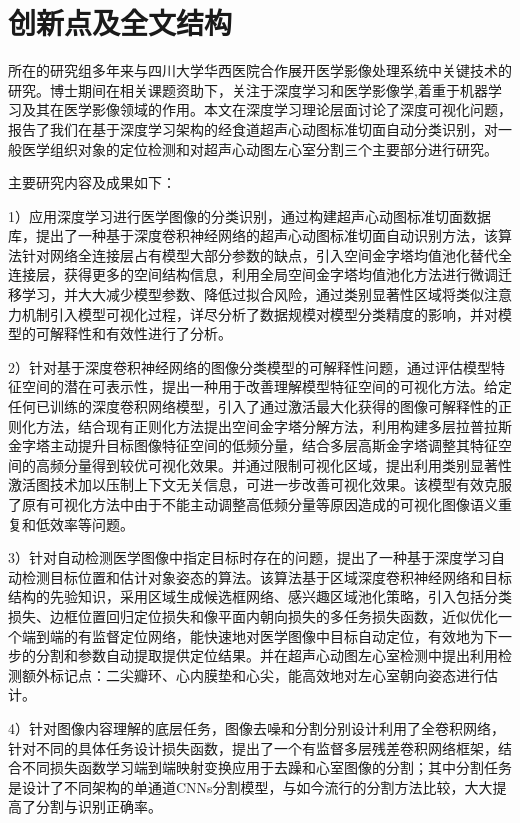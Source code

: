 \section{创新点及全文结构}

所在的研究组多年来与四川大学华西医院合作展开医学影像处理系统中关键技术的研究。博士期间在相关课题资助下，关注于深度学习和医学影像学,着重于机器学习及其在医学影像领域的作用。本文在深度学习理论层面讨论了深度可视化问题，报告了我们在基于深度学习架构的经食道超声心动图标准切面自动分类识别，对一般医学组织对象的定位检测和对超声心动图左心室分割三个主要部分进行研究。

主要研究内容及成果如下：

1）应用深度学习进行医学图像的分类识别，通过构建超声心动图标准切面数据库，提出了一种基于深度卷积神经网络的超声心动图标准切面自动识别方法，该算法针对网络全连接层占有模型大部分参数的缺点，引入空间金字塔均值池化替代全连接层，获得更多的空间结构信息，利用全局空间金字塔均值池化方法进行微调迁移学习，并大大减少模型参数、降低过拟合风险，通过类别显著性区域将类似注意力机制引入模型可视化过程，详尽分析了数据规模对模型分类精度的影响，并对模型的可解释性和有效性进行了分析。

2）针对基于深度卷积神经网络的图像分类模型的可解释性问题，通过评估模型特征空间的潜在可表示性，提出一种用于改善理解模型特征空间的可视化方法。给定任何已训练的深度卷积网络模型，引入了通过激活最大化获得的图像可解释性的正则化方法，结合现有正则化方法提出空间金字塔分解方法，利用构建多层拉普拉斯金字塔主动提升目标图像特征空间的低频分量，结合多层高斯金字塔调整其特征空间的高频分量得到较优可视化效果。并通过限制可视化区域，提出利用类别显著性激活图技术加以压制上下文无关信息，可进一步改善可视化效果。该模型有效克服了原有可视化方法中由于不能主动调整高低频分量等原因造成的可视化图像语义重复和低效率等问题。

3）针对自动检测医学图像中指定目标时存在的问题，提出了一种基于深度学习自动检测目标位置和估计对象姿态的算法。该算法基于区域深度卷积神经网络和目标结构的先验知识，采用区域生成候选框网络、感兴趣区域池化策略，引入包括分类损失、边框位置回归定位损失和像平面内朝向损失的多任务损失函数，近似优化一个端到端的有监督定位网络，能快速地对医学图像中目标自动定位，有效地为下一步的分割和参数自动提取提供定位结果。并在超声心动图左心室检测中提出利用检测额外标记点：二尖瓣环、心内膜垫和心尖，能高效地对左心室朝向姿态进行估计。

4）针对图像内容理解的底层任务，图像去噪和分割分别设计利用了全卷积网络，针对不同的具体任务设计损失函数，提出了一个有监督多层残差卷积网络框架，结合不同损失函数学习端到端映射变换应用于去躁和心室图像的分割；其中分割任务是设计了不同架构的单通道CNNs分割模型，与如今流行的分割方法比较，大大提高了分割与识别正确率。



